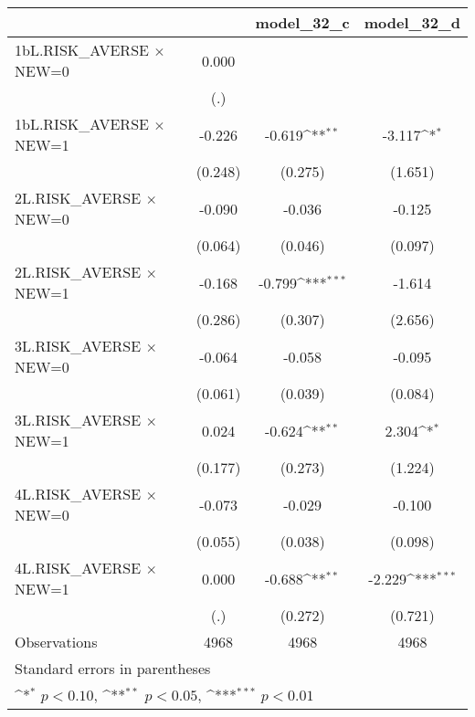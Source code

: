 {
\def\sym#1{\ifmmode^{#1}\else\(^{#1}\)\fi}
\begin{longtable}{l*{3}{c}}
\toprule\endfirsthead\midrule\endhead\midrule\endfoot\endlastfoot
                &\multicolumn{1}{c}{}&\multicolumn{1}{c}{model\_32\_c}&\multicolumn{1}{c}{model\_32\_d}\\
\midrule
1bL.RISK\_AVERSE $\times$ NEW=0&    0.000         &                  &                  \\
                &      (.)         &                  &                  \\
\addlinespace
1bL.RISK\_AVERSE $\times$ NEW=1&   -0.226         &   -0.619\sym{**} &   -3.117\sym{*}  \\
                &  (0.248)         &  (0.275)         &  (1.651)         \\
\addlinespace
2L.RISK\_AVERSE $\times$ NEW=0&   -0.090         &   -0.036         &   -0.125         \\
                &  (0.064)         &  (0.046)         &  (0.097)         \\
\addlinespace
2L.RISK\_AVERSE $\times$ NEW=1&   -0.168         &   -0.799\sym{***}&   -1.614         \\
                &  (0.286)         &  (0.307)         &  (2.656)         \\
\addlinespace
3L.RISK\_AVERSE $\times$ NEW=0&   -0.064         &   -0.058         &   -0.095         \\
                &  (0.061)         &  (0.039)         &  (0.084)         \\
\addlinespace
3L.RISK\_AVERSE $\times$ NEW=1&    0.024         &   -0.624\sym{**} &    2.304\sym{*}  \\
                &  (0.177)         &  (0.273)         &  (1.224)         \\
\addlinespace
4L.RISK\_AVERSE $\times$ NEW=0&   -0.073         &   -0.029         &   -0.100         \\
                &  (0.055)         &  (0.038)         &  (0.098)         \\
\addlinespace
4L.RISK\_AVERSE $\times$ NEW=1&    0.000         &   -0.688\sym{**} &   -2.229\sym{***}\\
                &      (.)         &  (0.272)         &  (0.721)         \\
\midrule
Observations    &     4968         &     4968         &     4968         \\
\bottomrule
\multicolumn{4}{l}{\footnotesize Standard errors in parentheses}\\
\multicolumn{4}{l}{\footnotesize \sym{*} \(p<0.10\), \sym{**} \(p<0.05\), \sym{***} \(p<0.01\)}\\
\end{longtable}
}
